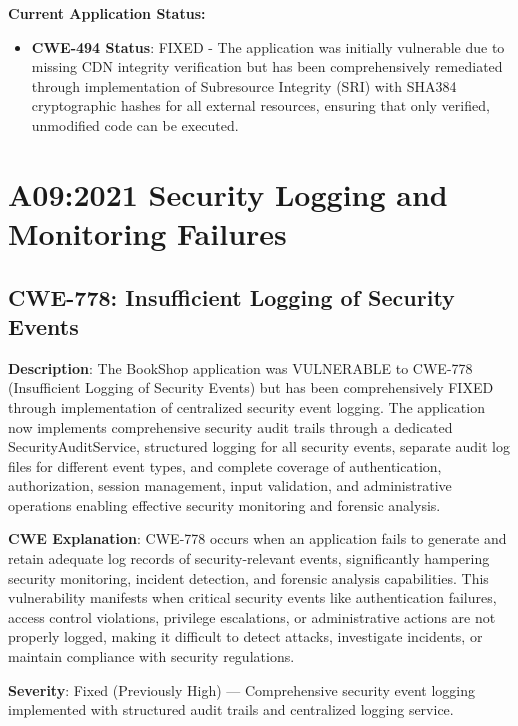 \documentclass[]{UCD_CS_FYP_Report}
\begin{document}
\textbf{Current Application Status:}
\begin{itemize}
	\item \textbf{CWE-494 Status}: FIXED - The application was initially vulnerable due to missing CDN integrity verification but has been comprehensively remediated through implementation of Subresource Integrity (SRI) with SHA384 cryptographic hashes for all external resources, ensuring that only verified, unmodified code can be executed.
\end{itemize}

\chapter{A09:2021 Security Logging and Monitoring Failures}

\section{CWE-778: Insufficient Logging of Security Events}

\textbf{Description}: The BookShop application was VULNERABLE to CWE-778 (Insufficient Logging of Security Events) but has been comprehensively FIXED through implementation of centralized security event logging. The application now implements comprehensive security audit trails through a dedicated SecurityAuditService, structured logging for all security events, separate audit log files for different event types, and complete coverage of authentication, authorization, session management, input validation, and administrative operations enabling effective security monitoring and forensic analysis.

\textbf{CWE Explanation}: CWE-778 occurs when an application fails to generate and retain adequate log records of security-relevant events, significantly hampering security monitoring, incident detection, and forensic analysis capabilities. This vulnerability manifests when critical security events like authentication failures, access control violations, privilege escalations, or administrative actions are not properly logged, making it difficult to detect attacks, investigate incidents, or maintain compliance with security regulations.

\textbf{Severity}: Fixed (Previously High) — Comprehensive security event logging implemented with structured audit trails and centralized logging service.
\end{document}

